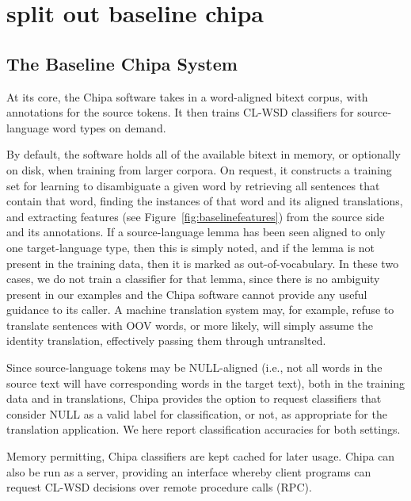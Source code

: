 \chapter{split out baseline chipa}
\label{chap:baseline}

\section{The Baseline Chipa System}
At its core, the Chipa software takes in a word-aligned bitext corpus, with
annotations for the source tokens. It then trains CL-WSD classifiers for
source-language word types on demand. 

By default, the software holds all of the available bitext in memory, or
optionally on disk, when training from larger corpora. On request, it
constructs a training set for learning to disambiguate a given word
by retrieving all sentences that contain that word,
finding the instances of that word and its aligned translations, and extracting
features (see Figure~\ref{fig:baselinefeatures}) from the source side and its
annotations.
If a source-language lemma has been seen aligned to only one target-language
type, then this is simply noted, and if the lemma is not present in the
training data, then it is marked as out-of-vocabulary. In these two
cases, we do not train a classifier for that lemma, since there is no
ambiguity present in our examples and the Chipa software cannot provide any
useful guidance to its caller. A machine translation system may, for example,
refuse to translate sentences with OOV words, or more likely, will simply
assume the identity translation, effectively passing them through untranslted.

Since source-language tokens may be NULL-aligned (i.e., not all words in the
source text will have corresponding words in the target text), both in the
training data and in translations, Chipa provides the option to request
classifiers that consider NULL as a valid label for classification, or not, as
appropriate for the translation application. We here report classification
accuracies for both settings.

Memory permitting, Chipa classifiers are kept cached for later usage. Chipa can
also be run as a server, providing an interface whereby client programs can
request CL-WSD decisions over remote procedure calls (RPC).

